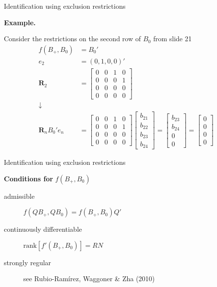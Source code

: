 \documentclass[notes,blackandwhite,mathsans,usenames,dvipsnames]{beamer}
\begin{document}
\begin{frame}{Identification using exclusion restrictions}

\textbf{Example.}

{\color{mcxs2}Consider the restrictions on the second row of} $B_0$ {\color{mcxs2}from slide 21}
\begin{align*}
f\left(B_+,B_0\right)&=B_0'\\
e_2 &= (0,1,0,0)'\\
\mathbf{R}_2 &= \begin{bmatrix} 0&0&1&0\\0&0&0&1\\0&0&0&0\\0&0&0&0 \end{bmatrix}\\
\downarrow&\\
\mathbf{R}_n B_0' e_n &= \begin{bmatrix} 0&0&1&0\\0&0&0&1\\0&0&0&0\\0&0&0&0 \end{bmatrix} \begin{bmatrix} b_{21}\\b_{22}\\ b_{23}\\b_{24}\end{bmatrix} = \begin{bmatrix} b_{23}\\b_{24}\\0\\0\end{bmatrix}= \begin{bmatrix} 0\\0\\0\\0\end{bmatrix}
\end{align*}

\end{frame}




\begin{frame}{Identification using exclusion restrictions}

\textbf{Conditions for} $f\left(B_+,B_0\right)$

\bigskip\begin{description}
\item[admissible] $f\left(QB_+,QB_0\right)= f\left(B_+,B_0\right)Q'$
\item[continuously differentiable] $\text{rank}\left[f'\left(B_+,B_0\right)\right]=RN$
\item[strongly regular] {\color{mcxs2}see Rubio-Ram\'irez, Waggoner \& Zha (2010)}
\end{description}

\end{frame}
\end{document}
